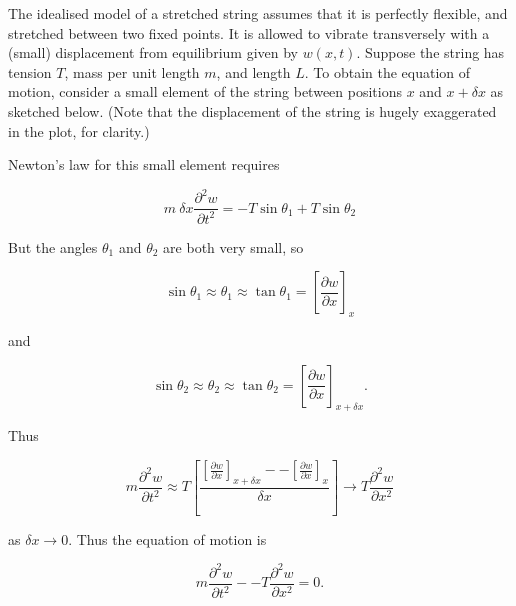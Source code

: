   The idealised model of a stretched string assumes that it is perfectly 
  flexible, and stretched between two fixed points. It is allowed to vibrate 
  transversely with a (small) displacement from equilibrium given by $w(x,t)$. 
  Suppose the string has tension $T$, mass per unit length $m$, and length $L$. 
  To obtain the equation of motion, consider a small element of the string 
  between positions $x$ and $x+ \delta x$ as sketched below. (Note that the 
  displacement of the string is hugely exaggerated in the plot, for clarity.) 


  Newton's law for this small element requires 

  \begin{equation*}m~\delta x \frac{\partial^2 w}{\partial t^2} =-T \sin 
  \theta_1 + T \sin\theta_2 \tag{1}\end{equation*} 

  But the angles $\theta_1$ and $\theta_2$ are both very small, so 

  \begin{equation*}\sin \theta_1 \approx \theta_1 \approx \tan \theta_1 = 
  \left[ \frac{\partial w}{\partial x} \right] _x \tag{2}\end{equation*} 

  \noindent{}and 

  \begin{equation*}\sin \theta_2 \approx \theta_2 \approx \tan \theta_2 = 
  \left[ \frac{\partial w}{\partial x} \right] _{x + \delta x}. 
  \tag{3}\end{equation*} 

  Thus 

  \begin{equation*}m \frac{\partial^2 w}{\partial t^2} \approx T \left[ 
  \dfrac{\left[ \frac{\partial w}{\partial x} \right] _{x + \delta x} -- \left[ 
  \frac{\partial w}{\partial x} \right] _{x} }{\delta x} \right] \rightarrow T 
  \dfrac{\partial^2 w}{\partial x^2} \tag{4}\end{equation*} 

  \noindent{}as $\delta x \rightarrow 0$. Thus the equation of motion is 

  \begin{equation*}m \frac{\partial^2 w}{\partial t^2} -- T \dfrac{\partial^2 
  w}{\partial x^2} =0 . \tag{5}\end{equation*} 

